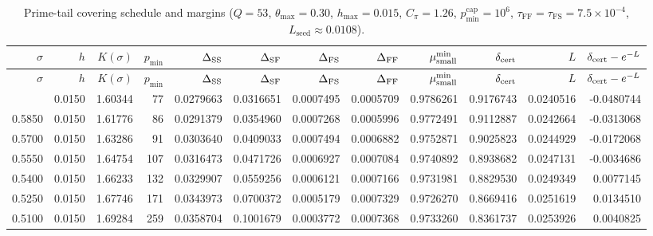\setlength{\tabcolsep}{4.5pt}
\renewcommand{\arraystretch}{1.1}
\begin{longtable}{r r r r r r r r r r r r}
\caption{Prime-tail covering schedule and margins ($Q=53$, $\theta_{\max}=0.30$, $h_{\max}=0.015$, $C_{\pi}=1.26$, $p_{\min}^{\mathrm{cap}}=10^6$, $\tau_{\mathrm{FF}}=\tau_{\mathrm{FS}}=7.5\times10^{-4}$, $L_{\mathrm{seed}}\approx0.0108$).}\label{tab:prime-tail-certificate}\\
\toprule
$\sigma$ & $h$ & $K(\sigma)$ & $p_{\min}$ & $\Delta_{\rm SS}$ & $\Delta_{\rm SF}$ & $\Delta_{\rm FS}$ & $\Delta_{\rm FF}$ & $\mu_{\rm small}^{\min}$ & $\delta_{\rm cert}$ & $L$ & $\delta_{\rm cert}-e^{-L}$ \\
\midrule
\endfirsthead
\toprule
$\sigma$ & $h$ & $K(\sigma)$ & $p_{\min}$ & $\Delta_{\rm SS}$ & $\Delta_{\rm SF}$ & $\Delta_{\rm FS}$ & $\Delta_{\rm FF}$ & $\mu_{\rm small}^{\min}$ & $\delta_{\rm cert}$ & $L$ & $\delta_{\rm cert}-e^{-L}$ \\
\midrule
\endhead
\bottomrule
\endlastfoot
0.6000 & 0.0150 & 1.60344 & 77 & 0.0279663 & 0.0316651 & 0.0007495 & 0.0005709 & 0.9786261 & 0.9176743 & 0.0240516 & -0.0480744 \\
0.5850 & 0.0150 & 1.61776 & 86 & 0.0291379 & 0.0354960 & 0.0007268 & 0.0005996 & 0.9772491 & 0.9112887 & 0.0242664 & -0.0313068 \\
0.5700 & 0.0150 & 1.63286 & 91 & 0.0303640 & 0.0409033 & 0.0007494 & 0.0006882 & 0.9752871 & 0.9025823 & 0.0244929 & -0.0172068 \\
0.5550 & 0.0150 & 1.64754 & 107 & 0.0316473 & 0.0471726 & 0.0006927 & 0.0007084 & 0.9740892 & 0.8938682 & 0.0247131 & -0.0034686 \\
0.5400 & 0.0150 & 1.66233 & 132 & 0.0329907 & 0.0559256 & 0.0006121 & 0.0007166 & 0.9731981 & 0.8829530 & 0.0249349 & 0.0077145 \\
0.5250 & 0.0150 & 1.67746 & 171 & 0.0343973 & 0.0700372 & 0.0005179 & 0.0007329 & 0.9726270 & 0.8669416 & 0.0251619 & 0.0134510 \\
0.5100 & 0.0150 & 1.69284 & 259 & 0.0358704 & 0.1001679 & 0.0003772 & 0.0007368 & 0.9733260 & 0.8361737 & 0.0253926 & 0.0040825 \\
\end{longtable}
